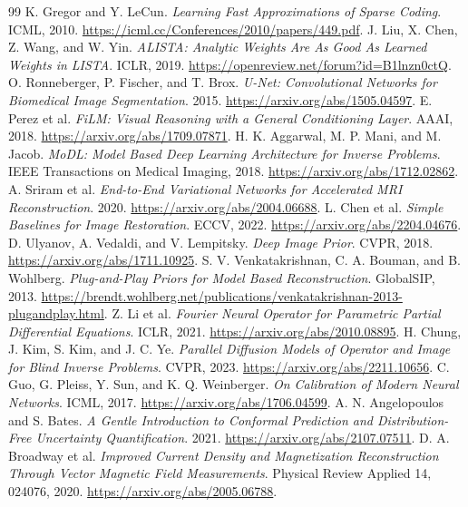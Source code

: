 \begingroup\small
\begin{thebibliography}{99}
\setlength{\itemsep}{3pt}
\setlength{\parskip}{0pt}
 K. Gregor and Y. LeCun. \emph{Learning Fast Approximations of Sparse Coding}. ICML, 2010. \url{https://icml.cc/Conferences/2010/papers/449.pdf}.
 J. Liu, X. Chen, Z. Wang, and W. Yin. \emph{ALISTA: Analytic Weights Are As Good As Learned Weights in LISTA}. ICLR, 2019. \url{https://openreview.net/forum?id=B1lnzn0ctQ}.
 O. Ronneberger, P. Fischer, and T. Brox. \emph{U-Net: Convolutional Networks for Biomedical Image Segmentation}. 2015. \url{https://arxiv.org/abs/1505.04597}.
 E. Perez et al. \emph{FiLM: Visual Reasoning with a General Conditioning Layer}. AAAI, 2018. \url{https://arxiv.org/abs/1709.07871}.
 H. K. Aggarwal, M. P. Mani, and M. Jacob. \emph{MoDL: Model Based Deep Learning Architecture for Inverse Problems}. IEEE Transactions on Medical Imaging, 2018. \url{https://arxiv.org/abs/1712.02862}.
 A. Sriram et al. \emph{End-to-End Variational Networks for Accelerated MRI Reconstruction}. 2020. \url{https://arxiv.org/abs/2004.06688}.
 L. Chen et al. \emph{Simple Baselines for Image Restoration}. ECCV, 2022. \url{https://arxiv.org/abs/2204.04676}.
 D. Ulyanov, A. Vedaldi, and V. Lempitsky. \emph{Deep Image Prior}. CVPR, 2018. \url{https://arxiv.org/abs/1711.10925}.
 S. V. Venkatakrishnan, C. A. Bouman, and B. Wohlberg. \emph{Plug-and-Play Priors for Model Based Reconstruction}. GlobalSIP, 2013. \url{https://brendt.wohlberg.net/publications/venkatakrishnan-2013-plugandplay.html}.
 Z. Li et al. \emph{Fourier Neural Operator for Parametric Partial Differential Equations}. ICLR, 2021. \url{https://arxiv.org/abs/2010.08895}.
 H. Chung, J. Kim, S. Kim, and J. C. Ye. \emph{Parallel Diffusion Models of Operator and Image for Blind Inverse Problems}. CVPR, 2023. \url{https://arxiv.org/abs/2211.10656}.
 C. Guo, G. Pleiss, Y. Sun, and K. Q. Weinberger. \emph{On Calibration of Modern Neural Networks}. ICML, 2017. \url{https://arxiv.org/abs/1706.04599}.
 A. N. Angelopoulos and S. Bates. \emph{A Gentle Introduction to Conformal Prediction and Distribution-Free Uncertainty Quantification}. 2021. \url{https://arxiv.org/abs/2107.07511}.
 D. A. Broadway et al. \emph{Improved Current Density and Magnetization Reconstruction Through Vector Magnetic Field Measurements}. Physical Review Applied 14, 024076, 2020. \url{https://arxiv.org/abs/2005.06788}.

\end{thebibliography}

